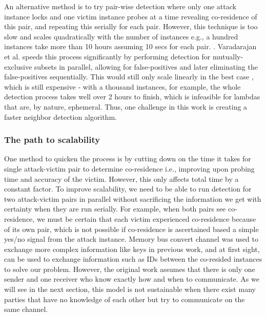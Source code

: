 An alternative method is to 
try pair-wise detection where only one attack instance locks and one victim 
instance probes at a time revealing co-residence of this pair, 
and repeating this serially for each pair. However, this technique is too slow and 
scales quadratically with the number of instances e.g., a hundred instances take 
more than 10 hours assuming 10 secs for each pair. . Varadarajan et al.\cite{varad191016} speeds this process significantly by performing 
detection for mutually-exclusive subsets in parallel, allowing for false-positives 
and later eliminating the false-positives sequentially.  
This would still only scale linearly in the best case , 
which is still expensive - with a thousand instances, for example, 
the whole detection process takes well over 2 hours to finish, which is infeasible 
for lambdas that are, by nature, ephemeral. Thus, one challenge in this work is 
creating a faster neighbor detection algorithm.

\subsubsection{The path to scalability}

One method to quicken the process is by cutting down on the time 
it takes for single attack-victim pair to determine co-residence
i.e., improving upon probing time and accuracy of the victim. However,
this only affects total time by a constant factor. To improve
scalability, we need to be able to run detection for two attack-victim 
pairs in parallel without sacrificing the information we get with certainty 
when they are run serially. For example, when both pairs see 
co-residence, we must be certain that each victim experienced co-residence because of its 
own pair, which is not possible if co-residence is ascertained based a simple yes/no signal from the attack 
instance.  Memory bus convert channel was used to exchange 
more complex information like keys in previous work\cite{wuusenix2012}, 
and at first sight, can be used to exchange information such as IDs between the 
co-resided instances to solve our problem. However, the original work assumes that 
there is only one sender and one receiver who know exactly how 
and when to communicate. As we will see in the next section, this model is not sustainable
when there exist many parties that have no knowledge of each other but try to communicate
on the same channel.

